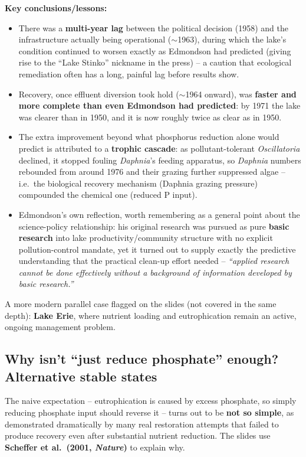 \documentclass[11pt,a4paper]{article}
\begin{document}
\begin{papbox}[title={Paper Summary: ``Rescue of Lake Stinko'' -- the story of the Lake Washington restoration (University of Washington, based on W.T.\ Edmondson's research)}]
\textbf{Key conclusions/lessons:}
\begin{itemize}[leftmargin=1.3em,nosep]
\item There was a \textbf{multi-year lag} between the political decision (1958) and the infrastructure actually being operational ($\sim$1963), during which the lake's condition continued to worsen exactly as Edmondson had predicted (giving rise to the ``Lake Stinko'' nickname in the press) -- a caution that ecological remediation often has a long, painful lag before results show.
\item Recovery, once effluent diversion took hold ($\sim$1964 onward), was \textbf{faster and more complete than even Edmondson had predicted}: by 1971 the lake was clearer than in 1950, and it is now roughly twice as clear as in 1950.
\item The extra improvement beyond what phosphorus reduction alone would predict is attributed to a \textbf{trophic cascade}: as pollutant-tolerant \textit{Oscillatoria} declined, it stopped fouling \textit{Daphnia}'s feeding apparatus, so \textit{Daphnia} numbers rebounded from around 1976 and their grazing further suppressed algae -- i.e.\ the biological recovery mechanism (Daphnia grazing pressure) compounded the chemical one (reduced P input).
\item Edmondson's own reflection, worth remembering as a general point about the science-policy relationship: his original research was pursued as pure \textbf{basic research} into lake productivity/community structure with no explicit pollution-control mandate, yet it turned out to supply exactly the predictive understanding that the practical clean-up effort needed -- \emph{``applied research cannot be done effectively without a background of information developed by basic research.''}
\end{itemize}
\end{papbox}

A more modern parallel case flagged on the slides (not covered in the same depth): \textbf{Lake Erie}, where nutrient loading and eutrophication remain an active, ongoing management problem.

\subsection{Why isn't ``just reduce phosphate'' enough? Alternative stable states}
The naive expectation -- eutrophication is caused by excess phosphate, so simply reducing phosphate input should reverse it -- turns out to be \textbf{not so simple}, as demonstrated dramatically by many real restoration attempts that failed to produce recovery even after substantial nutrient reduction. The slides use \textbf{Scheffer et al.\ (2001, \textit{Nature})} to explain why.
\end{document}
